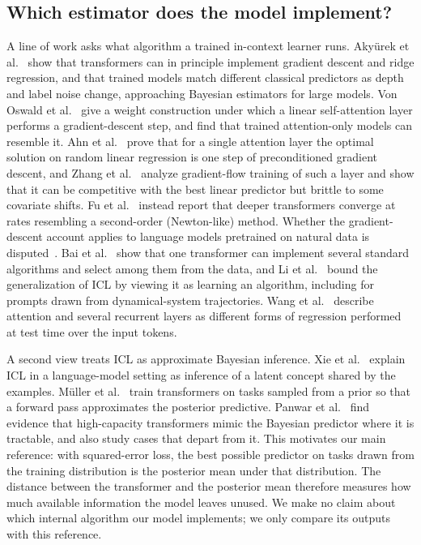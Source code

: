 \documentclass{article}
\begin{document}
\subsection{Which estimator does the model implement?}
A line of work asks what algorithm a trained in-context learner runs. Aky\"urek et al.~\cite{akyurek2022} show that transformers can in principle implement gradient descent and ridge regression, and that trained models match different classical predictors as depth and label noise change, approaching Bayesian estimators for large models. Von Oswald et al.~\cite{vonoswald2022} give a weight construction under which a linear self-attention layer performs a gradient-descent step, and find that trained attention-only models can resemble it. Ahn et al.~\cite{ahn2023} prove that for a single attention layer the optimal solution on random linear regression is one step of preconditioned gradient descent, and Zhang et al.~\cite{zhang2023} analyze gradient-flow training of such a layer and show that it can be competitive with the best linear predictor but brittle to some covariate shifts. Fu et al.~\cite{fu2023} instead report that deeper transformers converge at rates resembling a second-order (Newton-like) method. Whether the gradient-descent account applies to language models pretrained on natural data is disputed~\cite{shen2023}. Bai et al.~\cite{bai2023} show that one transformer can implement several standard algorithms and select among them from the data, and Li et al.~\cite{li2023} bound the generalization of ICL by viewing it as learning an algorithm, including for prompts drawn from dynamical-system trajectories. Wang et al.~\cite{wang2025} describe attention and several recurrent layers as different forms of regression performed at test time over the input tokens.

A second view treats ICL as approximate Bayesian inference. Xie et al.~\cite{xie2021} explain ICL in a language-model setting as inference of a latent concept shared by the examples. M\"uller et al.~\cite{muller2021} train transformers on tasks sampled from a prior so that a forward pass approximates the posterior predictive. Panwar et al.~\cite{panwar2023} find evidence that high-capacity transformers mimic the Bayesian predictor where it is tractable, and also study cases that depart from it. This motivates our main reference: with squared-error loss, the best possible predictor on tasks drawn from the training distribution is the posterior mean under that distribution. The distance between the transformer and the posterior mean therefore measures how much available information the model leaves unused. We make no claim about which internal algorithm our model implements; we only compare its outputs with this reference.
\end{document}

